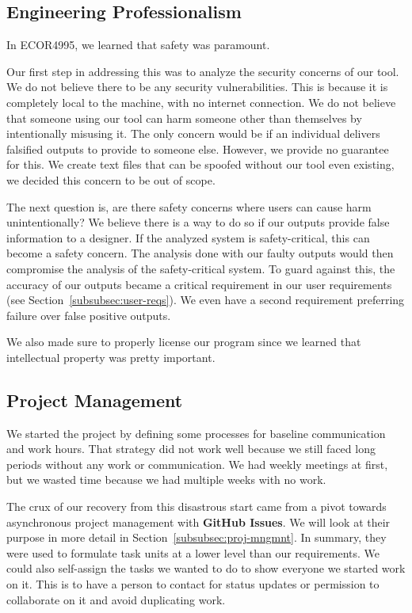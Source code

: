 
\subsection{Engineering Professionalism}\label{subsec:engineering-professionalism}
In ECOR4995, we learned that safety was paramount.

Our first step in addressing this was to analyze the security concerns of our tool.
We do not believe there to be any security vulnerabilities.
This is because it is completely local to the machine, with no internet connection.
We do not believe that someone using our tool can harm someone other than themselves by intentionally misusing it.
The only concern would be if an individual delivers falsified outputs to provide to someone else.
However, we provide no guarantee for this.
We create text files that can be spoofed without our tool even existing, we decided this concern to be out of scope.

The next question is, are there safety concerns where users can cause harm unintentionally?
We believe there is a way to do so if our outputs provide false information to a designer.
If the analyzed system is safety-critical, this can become a safety concern.
The analysis done with our faulty outputs would then compromise the analysis of the safety-critical system.
To guard against this, the accuracy of our outputs became a critical requirement in our user requirements (see Section~\ref{subsubsec:user-reqs}).
We even have a second requirement preferring failure over false positive outputs.

We also made sure to properly license our program since we learned that intellectual property was pretty important.

\subsection{Project Management}\label{subsec:project-management}
We started the project by defining some processes for baseline communication and work hours.
That strategy did not work well because we still faced long periods without any work or communication.
We had weekly meetings at first, but we wasted time because we had multiple weeks with no work.

The crux of our recovery from this disastrous start came from a pivot towards asynchronous project management with \textbf{GitHub Issues}.
We will look at their purpose in more detail in Section~\ref{subsubsec:proj-mngmnt}.
In summary, they were used to formulate task units at a lower level than our requirements.
We could also self-assign the tasks we wanted to do to show everyone we started work on it.
This is to have a person to contact for status updates or permission to collaborate on it and avoid duplicating work.

